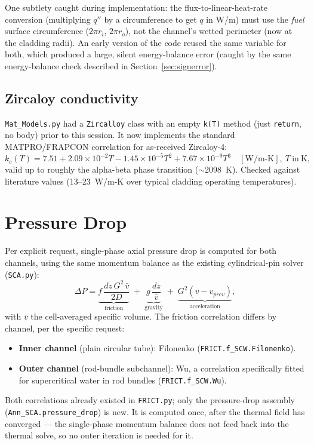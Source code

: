 \documentclass[11pt]{article}
\begin{document}
One subtlety caught during implementation: the flux-to-linear-heat-rate
conversion (multiplying $q''$ by a circumference to get $q$ in W/m) must
use the \emph{fuel} surface circumference ($2\pi r_i$, $2\pi r_o$), not
the channel's wetted perimeter (now at the cladding radii). An early
version of the code reused the same variable for both, which produced a
large, silent energy-balance error (caught by the same energy-balance
check described in Section~\ref{sec:signerror}).

\subsection{Zircaloy conductivity}

\texttt{Mat\_Models.py} had a \texttt{Zircalloy} class with an empty
\texttt{k(T)} method (just \texttt{return}, no body) prior to this session.
It now implements the standard MATPRO/FRAPCON correlation for
as-received Zircaloy-4:
\begin{equation}
k_c(T) = 7.51 + 2.09\times10^{-2}T - 1.45\times10^{-5}T^2 +
7.67\times10^{-9}T^3 \quad [\mathrm{W/m\text{-}K}],\ T\ \mathrm{in\ K},
\end{equation}
valid up to roughly the alpha-beta phase transition ($\sim$2098~K). Checked
against literature values (13--23~W/m-K over typical cladding operating
temperatures).

\section{Pressure Drop}
\label{sec:pressure}

Per explicit request, single-phase axial pressure drop is computed for
both channels, using the same momentum balance as the existing
cylindrical-pin solver (\texttt{SCA.py}):
\begin{equation}
\Delta P = \underbrace{f\,\frac{dz\,G^2\,\bar{v}}{2D}}_{\text{friction}}
\;+\; \underbrace{g\,\frac{dz}{\bar{v}}}_{\text{gravity}}
\;+\; \underbrace{G^2(v - v_{prev})}_{\text{acceleration}},
\end{equation}
with $\bar v$ the cell-averaged specific volume. The friction correlation
differs by channel, per the specific request:
\begin{itemize}
\item \textbf{Inner channel} (plain circular tube): Filonenko
(\texttt{FRICT.f\_SCW.Filonenko}).
\item \textbf{Outer channel} (rod-bundle subchannel): Wu, a correlation
specifically fitted for supercritical water in rod bundles
(\texttt{FRICT.f\_SCW.Wu}).
\end{itemize}
Both correlations already existed in \texttt{FRICT.py}; only the
pressure-drop assembly (\texttt{Ann\_SCA.pressure\_drop}) is new. It is
computed once, after the thermal field has converged --- the single-phase
momentum balance does not feed back into the thermal solve, so no outer
iteration is needed for it.
\end{document}
